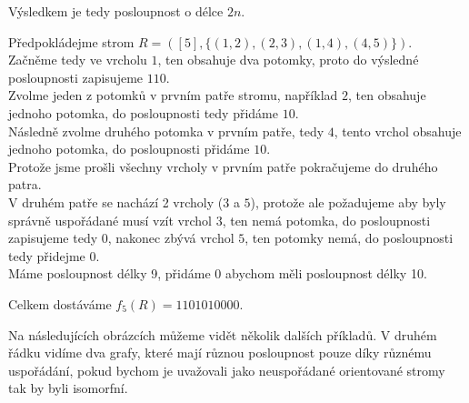 \documentclass[../main.tex]{subfiles}
\begin{document}
Výsledkem je tedy posloupnost o délce $2n$.

\begin{example}
    Předpokládejme strom $R=([5], \{(1,2), (2,3), (1,4), (4,5)\})$.\\
    Začněme tedy ve vrcholu $1$, ten obsahuje dva potomky, proto do výsledné posloupnosti zapisujeme $110$.\\
    Zvolme jeden z potomků v prvním patře stromu, například $2$, ten obsahuje jednoho potomka, do posloupnosti tedy přidáme $10$.\\
    Následně zvolme druhého potomka v prvním patře, tedy $4$, tento vrchol obsahuje jednoho potomka, do posloupnosti přidáme $10$.\\
    Protože jsme prošli všechny vrcholy v prvním patře pokračujeme do druhého patra.\\
    V druhém patře se nachází 2 vrcholy ($3$ a $5$), protože ale požadujeme aby byly správně uspořádané musí vzít vrchol $3$, 
    ten nemá potomka, do posloupnosti zapisujeme tedy $0$, nakonec zbývá vrchol $5$, ten potomky nemá, do posloupnosti tedy přidejme $0$.\\
    Máme posloupnost délky 9, přidáme $0$ abychom měli posloupnost délky 10. 
     
    Celkem dostáváme $f_5(R) = 1101010000$. 
    
\end{example}
Na následujících obrázcích můžeme vidět několik dalších příkladů. V druhém řádku vidíme dva grafy, které mají různou posloupnost pouze díky různému uspořádání, 
pokud bychom je uvažovali jako neuspořádané orientované stromy tak by byli isomorfní.
\end{document}
